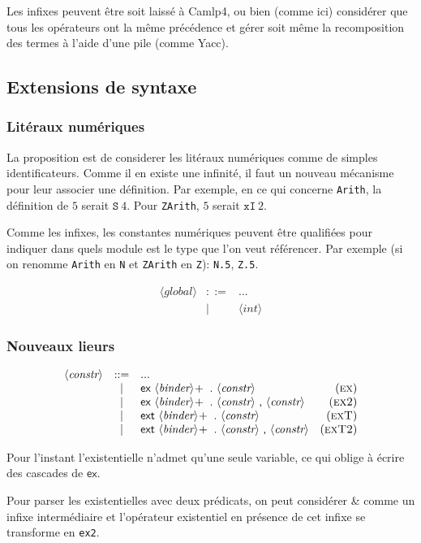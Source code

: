 \documentclass{article}
\def\NT#1{\langle\textit{#1}\rangle}
\def\TERM#1{\textsf{#1}}
\def\PLUS#1{#1\!+}
\def\EXTNT#1{\NT{#1} & ::= & ... \\&|&}
\def\RNAME#1{(\textsc{#1})}
\def\nlsep{\\&|&}
\begin{document}
Les infixes peuvent être soit laissé à Camlp4, ou bien (comme ici)
considérer que tous les opérateurs ont la même précédence et gérer
soit même la recomposition des termes à l'aide d'une pile (comme
Yacc).


\subsection{Extensions de syntaxe}

\subsubsection{Litéraux numériques}

La proposition est de considerer les litéraux numériques comme de
simples identificateurs. Comme il en existe une infinité, il faut un
nouveau mécanisme pour leur associer une définition. Par exemple, en
ce qui concerne \texttt{Arith}, la définition de $5$ serait
$\texttt{S}~4$. Pour \texttt{ZArith}, $5$ serait $\texttt{xI}~2$.

Comme les infixes, les constantes numériques peuvent être qualifiées
pour indiquer dans quels module est le type que l'on veut
référencer. Par exemple (si on renomme \texttt{Arith} en \texttt{N} et
\texttt{ZArith} en \texttt{Z}): \verb+N.5+, \verb+Z.5+.

\begin{eqnarray*}
\EXTNT{global}
      \NT{int}
\end{eqnarray*}

\subsubsection{Nouveaux lieurs}

$$
\begin{array}{rclr}
\EXTNT{constr}
       \TERM{ex}~\PLUS{\NT{binder}}~\TERM{.}~\NT{constr}  &\RNAME{ex}
\nlsep \TERM{ex}~\PLUS{\NT{binder}}~\TERM{.}~\NT{constr}~\TERM{,}~\NT{constr}
        &\RNAME{ex2}
\nlsep \TERM{ext}~\PLUS{\NT{binder}}~\TERM{.}~\NT{constr}  &\RNAME{exT}
\nlsep \TERM{ext}~\PLUS{\NT{binder}}~\TERM{.}~\NT{constr}~\TERM{,}~\NT{constr}
        &\RNAME{exT2}
\end{array}
$$

Pour l'instant l'existentielle n'admet qu'une seule variable, ce qui
oblige à écrire des cascades de $\TERM{ex}$.

Pour parser les existentielles avec deux prédicats, on peut considérer
\TERM{\&} comme un infixe intermédiaire et l'opérateur existentiel en
présence de cet infixe se transforme en \texttt{ex2}.
\end{document}
